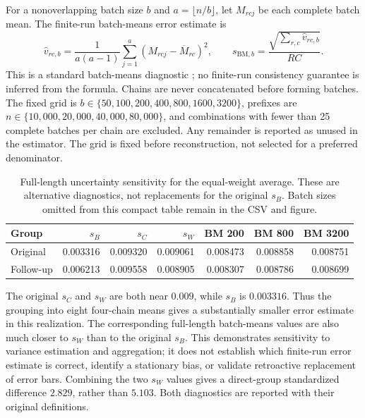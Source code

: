 \documentclass[11pt]{article}
\theoremstyle{definition}\newtheorem{definition}[theorem]{Definition}
\theoremstyle{remark}\newtheorem{remark}[theorem]{Remark}
\numberwithin{equation}{section}
\newcommand{\1}{\mathbf 1}
\begin{document}
For a nonoverlapping batch size $b$ and $a=\lfloor n/b\rfloor$, let $M_{rcj}$ be each complete batch mean. The finite-run batch-means error estimate is
\[
 \widehat v_{rc,b}=\frac{1}{a(a-1)}\sum_{j=1}^{a}(M_{rcj}-\overline M_{rc})^2,
 \qquad s_{\mathrm{BM},b}=\frac{\sqrt{\sum_{r,c}\widehat v_{rc,b}}}{RC}.
\]
This is a standard batch-means diagnostic \citep{flegal}; no finite-run consistency guarantee is inferred from the formula. Chains are never concatenated before forming batches. The fixed grid is $b\in\{50,100,200,400,800,1600,3200\}$, prefixes are $n\in\{10,000,20,000,40,000,80,000\}$, and combinations with fewer than 25 complete batches per chain are excluded. Any remainder is reported as unused in the estimator. The grid is fixed before reconstruction, not selected for a preferred denominator.

\begin{table}[!htbp]\centering\small
\caption{Full-length uncertainty sensitivity for the equal-weight average. These are alternative diagnostics, not replacements for the original $s_B$. Batch sizes omitted from this compact table remain in the CSV and figure.}\label{tab:uncertainty_r3}
\begin{tabular}{lrrrrrr}\toprule
Group&$s_B$&$s_C$&$s_W$&BM 200&BM 800&BM 3200\\\midrule
Original&0.003316&0.009320&0.009061&0.008473&0.008858&0.008751\\
Follow-up&0.006213&0.009558&0.008905&0.008307&0.008786&0.008699\\
\bottomrule\end{tabular}\end{table}
The original $s_C$ and $s_W$ are both near $0.009$, while $s_B$ is $0.003316$. Thus the grouping into eight four-chain means gives a substantially smaller error estimate in this realization. The corresponding full-length batch-means values are also much closer to $s_W$ than to the original $s_B$. This demonstrates sensitivity to variance estimation and aggregation; it does not establish which finite-run error estimate is correct, identify a stationary bias, or validate retroactive replacement of error bars. Combining the two $s_W$ values gives a direct-group standardized difference $2.829$, rather than $5.103$. Both diagnostics are reported with their original definitions.
\end{document}
